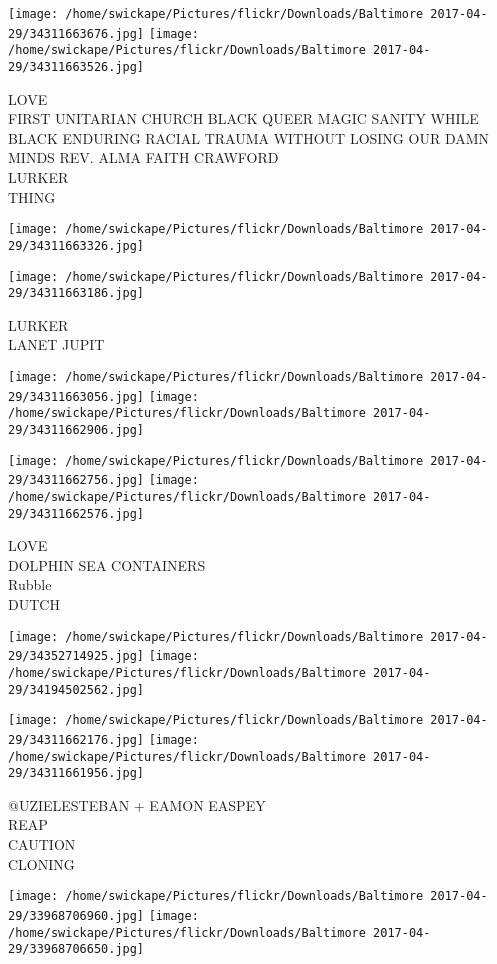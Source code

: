 \documentclass[10pt,letterpaper]{article}
\begin{document}
\texttt{[image: /home/swickape/Pictures/flickr/Downloads/Baltimore 2017-04-29/34311663676.jpg]}
\texttt{[image: /home/swickape/Pictures/flickr/Downloads/Baltimore 2017-04-29/34311663526.jpg]}

LOVE\\
FIRST UNITARIAN CHURCH BLACK QUEER MAGIC SANITY WHILE BLACK ENDURING RACIAL TRAUMA WITHOUT LOSING OUR DAMN MINDS REV. ALMA FAITH CRAWFORD\\
LURKER\\
THING
\pagebreak

\texttt{[image: /home/swickape/Pictures/flickr/Downloads/Baltimore 2017-04-29/34311663326.jpg]}

\vspace{0.25in}
\texttt{[image: /home/swickape/Pictures/flickr/Downloads/Baltimore 2017-04-29/34311663186.jpg]}

LURKER\\
LANET JUPIT
\pagebreak

\texttt{[image: /home/swickape/Pictures/flickr/Downloads/Baltimore 2017-04-29/34311663056.jpg]}
\texttt{[image: /home/swickape/Pictures/flickr/Downloads/Baltimore 2017-04-29/34311662906.jpg]}

\texttt{[image: /home/swickape/Pictures/flickr/Downloads/Baltimore 2017-04-29/34311662756.jpg]}
\texttt{[image: /home/swickape/Pictures/flickr/Downloads/Baltimore 2017-04-29/34311662576.jpg]}

LOVE\\
DOLPHIN SEA CONTAINERS\\
Rubble\\
DUTCH
\pagebreak

\texttt{[image: /home/swickape/Pictures/flickr/Downloads/Baltimore 2017-04-29/34352714925.jpg]}
\texttt{[image: /home/swickape/Pictures/flickr/Downloads/Baltimore 2017-04-29/34194502562.jpg]}

\texttt{[image: /home/swickape/Pictures/flickr/Downloads/Baltimore 2017-04-29/34311662176.jpg]}
\texttt{[image: /home/swickape/Pictures/flickr/Downloads/Baltimore 2017-04-29/34311661956.jpg]}

@UZIELESTEBAN + EAMON EASPEY\\
REAP\\
CAUTION\\
CLONING
\pagebreak

\texttt{[image: /home/swickape/Pictures/flickr/Downloads/Baltimore 2017-04-29/33968706960.jpg]}
\texttt{[image: /home/swickape/Pictures/flickr/Downloads/Baltimore 2017-04-29/33968706650.jpg]}
\end{document}
